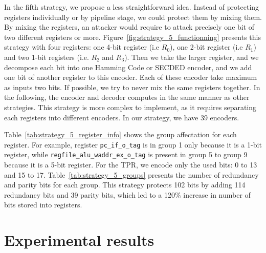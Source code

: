 In the fifth strategy, we propose a less straightforward idea. Instead of protecting registers individually or by pipeline stage, we could protect them by mixing them. By mixing the registers, an attacker would require to attack precisely one bit of two different registers or more. Figure~\ref{fig:strategy_5_functionning} presents this strategy with four registers: one 4-bit register (i.e $R_0$), one 2-bit register (i.e $R_1$) and two 1-bit registers (i.e. $R_2$ and $R_3$). Then we take the larger register, and we decompose each bit into one Hamming Code or SECDED encoder, and we add one bit of another register to this encoder. Each of these encoder take maximum as inputs two bits. If possible, we try to never mix the same registers together. In the following, the encoder and decoder computes in the same manner as other strategies. This strategy is more complex to implement, as it requires separating each registers into different encoders. In our strategy, we have 39 encoders.

Table~\ref{tab:strategy_5_register_info} shows the group affectation for each register. For example, register \texttt{pc\_if\_o\_tag} is in group 1 only because it is a 1-bit register, while \texttt{regfile\_alu\_waddr\_ex\_o\_tag} is present in group 5 to group 9 because it is a 5-bit register. For the TPR, we encode only the used bits: 0 to 13 and 15 to 17.
Table~\ref{tab:strategy_5_groups} presents the number of redundancy and parity bits for each group. This strategy protects 102 bits by adding 114 redundancy bits and 39 parity bits, which led to a 120\% increase in number of bits stored into registers.

\section{Experimental results}
\label{section:chap6_evaluation}

